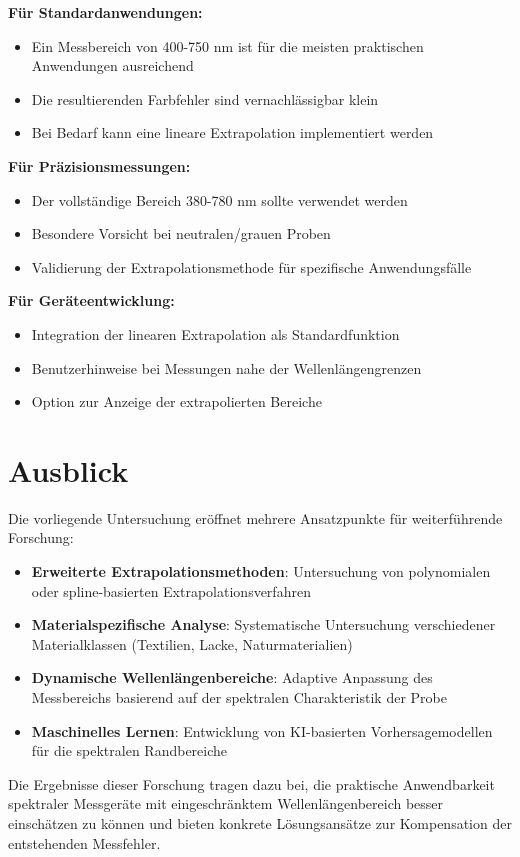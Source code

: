 \textbf{Für Standardanwendungen:}
\begin{itemize}
    \item Ein Messbereich von 400-750 nm ist für die meisten praktischen Anwendungen ausreichend
    \item Die resultierenden Farbfehler sind vernachlässigbar klein
    \item Bei Bedarf kann eine lineare Extrapolation implementiert werden
\end{itemize}

\textbf{Für Präzisionsmessungen:}
\begin{itemize}
    \item Der vollständige Bereich 380-780 nm sollte verwendet werden
    \item Besondere Vorsicht bei neutralen/grauen Proben
    \item Validierung der Extrapolationsmethode für spezifische Anwendungsfälle
\end{itemize}

\textbf{Für Geräteentwicklung:}
\begin{itemize}
    \item Integration der linearen Extrapolation als Standardfunktion
    \item Benutzerhinweise bei Messungen nahe der Wellenlängengrenzen
    \item Option zur Anzeige der extrapolierten Bereiche
\end{itemize}

\section{Ausblick}

Die vorliegende Untersuchung eröffnet mehrere Ansatzpunkte für weiterführende Forschung:

\begin{itemize}
    \item \textbf{Erweiterte Extrapolationsmethoden}: Untersuchung von polynomialen oder spline-basierten Extrapolationsverfahren
    
    \item \textbf{Materialspezifische Analyse}: Systematische Untersuchung verschiedener Materialklassen (Textilien, Lacke, Naturmaterialien)
    
    \item \textbf{Dynamische Wellenlängenbereiche}: Adaptive Anpassung des Messbereichs basierend auf der spektralen Charakteristik der Probe
    
    \item \textbf{Maschinelles Lernen}: Entwicklung von KI-basierten Vorhersagemodellen für die spektralen Randbereiche
\end{itemize}

Die Ergebnisse dieser Forschung tragen dazu bei, die praktische Anwendbarkeit spektraler Messgeräte mit eingeschränktem Wellenlängenbereich besser einschätzen zu können und bieten konkrete Lösungsansätze zur Kompensation der entstehenden Messfehler.
